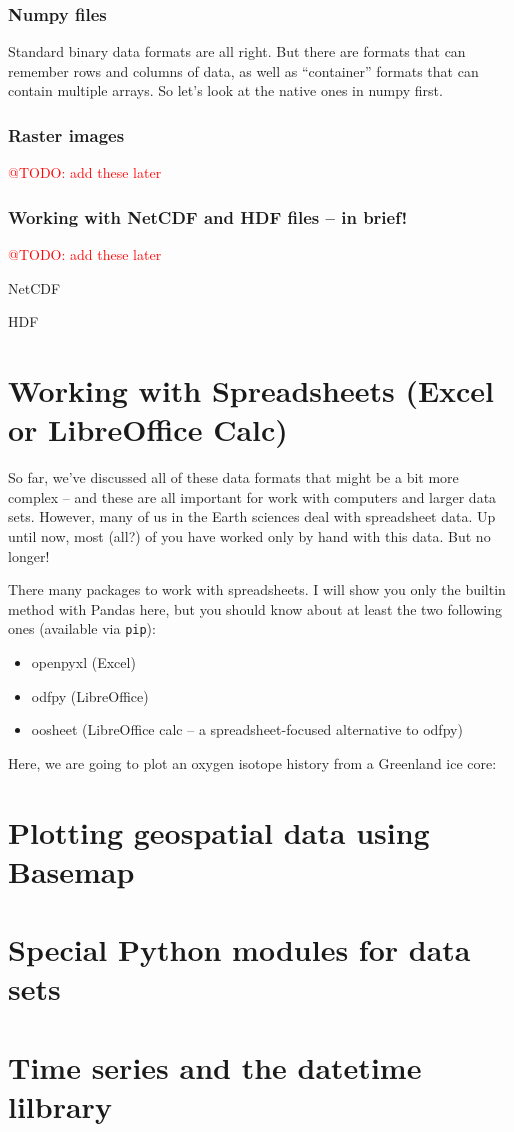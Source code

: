 \documentclass[a4paper,10pt]{scrartcl}
\makeatletter
\newcommand{\todo}[1]{\textcolor{red}{@TODO: #1}}
\makeatother
\begin{document}
\subsubsection{Numpy files}

Standard binary data formats are all right. But there are formats that can remember rows and columns of data, as well as ``container'' formats that can contain multiple arrays. So let's look at the native ones in numpy first.



\subsubsection{Raster images}

\todo{add these later}

\subsubsection{Working with NetCDF and HDF files -- in brief!}

\todo{add these later}

NetCDF

HDF

\section{Working with Spreadsheets (Excel or LibreOffice Calc)}

So far, we've discussed all of these data formats that might be a bit more complex -- and these are all important for work with computers and larger data sets. However, many of us in the Earth sciences deal with spreadsheet data. Up until now, most (all?) of you have worked only by hand with this data. But no longer!

There many packages to work with spreadsheets. I will show you only the builtin method with Pandas here, but you should know about at least the two following ones (available via \lstinline{pip}):
\begin{itemize}
 \item openpyxl (Excel)
 \item odfpy (LibreOffice)
 \item oosheet (LibreOffice calc -- a spreadsheet-focused alternative to odfpy)
\end{itemize}

Here, we are going to plot an oxygen isotope history from a Greenland ice core:



\section{Plotting geospatial data using Basemap}


\section{Special Python modules for data sets}


\section{Time series and the datetime lilbrary}
\end{document}
